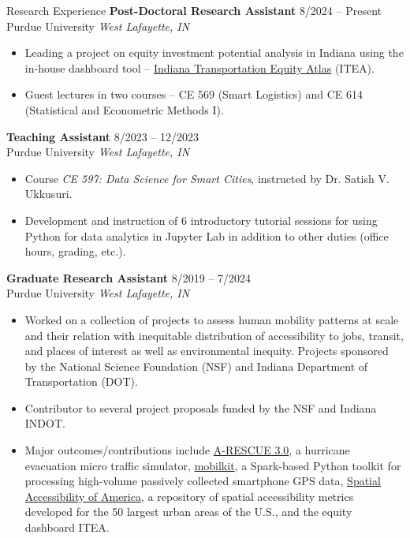 \documentclass{CV} %
\begin{document}
\begin{rSection}{Research Experience}
    {\bf Post-Doctoral Research Assistant} \hfill {8/2024 – Present}
    \\ Purdue University \hfill {\em West Lafayette, IN}
    \begin{itemize}[noitemsep]
        \item Leading a project on equity investment potential analysis in Indiana using the in-house dashboard tool – \href{https://tableau.it.purdue.edu/t/public/views/IndianaTransportationEquityAtlas/DashLong}{Indiana Transportation Equity Atlas} (ITEA).
        \item Guest lectures in two courses – CE 569 (Smart Logistics) and CE 614 (Statistical and Econometric Methods I).
    \end{itemize}
    
    {\bf Teaching Assistant} \hfill {8/2023 – 12/2023}
    \\ Purdue University \hfill {\em West Lafayette, IN}
    \begin{itemize}[noitemsep]
        \item Course {\em CE 597: Data Science for Smart Cities}, instructed by Dr. Satish V. Ukkusuri.
        \item Development and instruction of 6 introductory tutorial sessions for using Python for data analytics in Jupyter Lab in addition to other duties (office hours, grading, etc.).
    \end{itemize}
    
    {\bf Graduate Research Assistant} \hfill {8/2019 – 7/2024}
    \\ Purdue University \hfill {\em West Lafayette, IN}
    \begin{itemize}[noitemsep]
        \item Worked on a collection of projects to assess human mobility patterns at scale and their relation with inequitable distribution of accessibility to jobs, transit, and places of interest as well as environmental inequity. Projects sponsored by the National Science Foundation (NSF) and Indiana Department of Transportation (DOT).
        \item Contributor to several project proposals funded by the NSF and Indiana INDOT.
        \item Major outcomes/contributions include \href{https://umnilab.github.io/HSEES_doc/}{A-RESCUE 3.0}, a hurricane evacuation micro traffic simulator, \href{https://github.com/rvanxer/mk}{mobilkit}, a Spark-based Python toolkit for processing high-volume passively collected smartphone GPS data, \href{https://github.com/rvanxer/spr_4711}{Spatial Accessibility of America}, a repository of spatial accessibility metrics developed for the 50 largest urban areas of the U.S., and the equity dashboard ITEA.
    \end{itemize}
    

\end{rSection}
\end{document}
